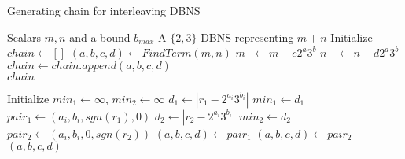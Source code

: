 \begin{algorithm}
\caption{Generating chain for interleaving DBNS}
\begin{algorithmic}
	\Require Scalars $m, n$ and a bound $b_{max}$
	\Ensure	A $\{2,3\}$-DBNS representing $m+n$
	\Statex
	\State Initialize $chain \gets [ ]$
		\State $(a,b,c,d) \gets FindTerm(m,n)$
		\State $m\phantom{n} \gets m - c2^a3^b$
		\State $n\phantom{m} \gets n - d2^a3^b$
		\State $chain \gets chain.append(a,b,c,d)$
	\EndWhile
	\\ \Return $chain$
\end{algorithmic}

\begin{algorithmic}
	\Statex
	\State Initialize $min_1 \gets \infty$, $min_2 \gets \infty$
		\State $d_1 \gets |r_1 - 2^{a_i}3^{b_i}|$
			\State $min_1 \gets d_1$
			\State $pair_1 \gets (a_i,b_i,sgn(r_1),0)$	
		\EndIf
		\State $d_2 \gets |r_2 - 2^{a_i}3^{b_i}|$
			\State $min_2 \gets d_2$
			\State $pair_2 \gets (a_i,b_i,0,sgn(r_2))$
		\EndIf
	\EndFor
		$(a,b,c,d) \gets pair_1$
	\Else
		$(a,b,c,d) \gets pair_2$
	\EndIf
	\\ \Return $(a,b,c,d)$
\end{algorithmic}

\label{interleaveDBNSChainAlgo}
\end{algorithm}




